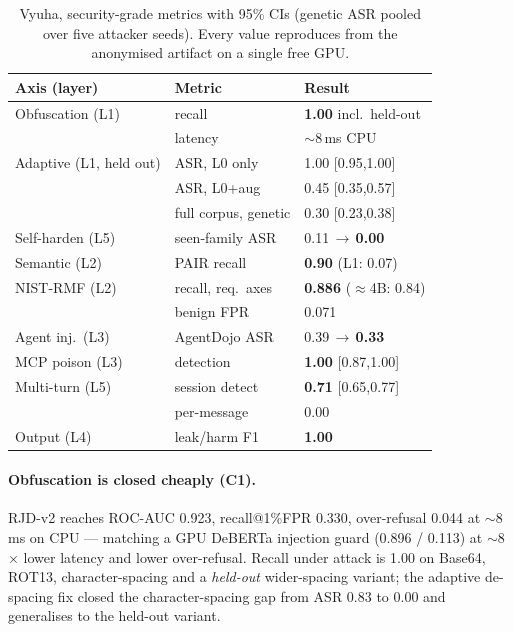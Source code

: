 \documentclass[11pt]{article}
\begin{document}
\begin{table}[t]
\centering\footnotesize\setlength{\tabcolsep}{4pt}
\begin{tabular}{@{}lll@{}}
\toprule
\textbf{Axis (layer)} & \textbf{Metric} & \textbf{Result} \\
\midrule
Obfuscation (L1) & recall & \textbf{1.00} incl.\ held-out \\
 & latency & $\sim$8\,ms CPU \\
Adaptive (L1, held out) & ASR, L0 only & 1.00 [0.95,1.00] \\
 & ASR, L0+aug & 0.45 [0.35,0.57] \\
 & full corpus, genetic & 0.30 [0.23,0.38] \\
Self-harden (L5) & seen-family ASR & 0.11\,$\rightarrow$\,\textbf{0.00} \\
Semantic (L2) & PAIR recall & \textbf{0.90} (L1: 0.07) \\
NIST-RMF (L2) & recall, req.\ axes & \textbf{0.886} ($\approx$4B: 0.84) \\
 & benign FPR & 0.071 \\
Agent inj.\ (L3) & AgentDojo ASR & 0.39\,$\rightarrow$\,\textbf{0.33} \\
MCP poison (L3) & detection & \textbf{1.00} [0.87,1.00] \\
Multi-turn (L5) & session detect & \textbf{0.71} [0.65,0.77] \\
 & per-message & 0.00 \\
Output (L4) & leak/harm F1 & \textbf{1.00} \\
\bottomrule
\end{tabular}
\caption{Vyuha, security-grade metrics with 95\% CIs (genetic ASR pooled over five attacker seeds).
Every value reproduces from the anonymised artifact on a single free GPU.}
\label{tab:main}
\end{table}

\paragraph{Obfuscation is closed cheaply (C1).} RJD-v2 reaches ROC-AUC 0.923, recall@1\%FPR 0.330,
over-refusal 0.044 at $\sim$8\,ms on CPU --- matching a GPU DeBERTa injection guard (0.896 / 0.113)
at $\sim$8$\times$ lower latency and lower over-refusal. Recall under attack is 1.00 on Base64, ROT13,
character-spacing and a \emph{held-out} wider-spacing variant; the adaptive de-spacing fix closed the
character-spacing gap from ASR 0.83 to 0.00 and generalises to the held-out variant.
\end{document}
